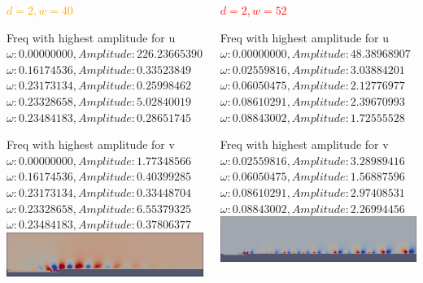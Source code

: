 \documentclass[
  aspectratio=169, %
  t, %
  onlytextwidth, %
  10pt, %
]{beamer}
\begin{document}
\begin{frame}
	\centering
	\begin{columns}[T] %
		\begin{column}{0.48\linewidth} %
			\textcolor{orange}{\textbf{$d=2, w=40$}}

			Freq with highest amplitude for u
			$ \omega : 0.00000000, Amplitude: 226.23665390$
			$ \omega : 0.16174536, Amplitude: 0.33523849$
			$ \omega : 0.23173134, Amplitude: 0.25998462$
			$ \omega : 0.23328658, Amplitude: 5.02840019$
			$ \omega : 0.23484183, Amplitude: 0.28651745$

			Freq with highest amplitude for v
			$ \omega : 0.00000000, Amplitude: 1.77348566$
			$ \omega : 0.16174536, Amplitude: 0.40399285$
			$ \omega : 0.23173134, Amplitude: 0.33448704$
			$ \omega : 0.23328658, Amplitude: 6.55379325$
			$ \omega : 0.23484183, Amplitude: 0.37806377$
			\includegraphics[width=\linewidth]{Images/d2_w40.png}
		\end{column}
		\begin{column}{0.48\linewidth} %
			\textcolor{red}{\textbf{$d=2, w=52$}}

			Freq with highest amplitude for u
			$ \omega : 0.00000000, Amplitude: 48.38968907$
			$ \omega : 0.02559816, Amplitude: 3.03884201$
			$ \omega : 0.06050475, Amplitude: 2.12776977$
			$ \omega : 0.08610291, Amplitude: 2.39670993$
			$ \omega : 0.08843002, Amplitude: 1.72555528$

			Freq with highest amplitude for v
			$ \omega : 0.02559816, Amplitude: 3.28989416$
			$ \omega : 0.06050475, Amplitude: 1.56887596$
			$ \omega : 0.08610291, Amplitude: 2.97408531$
			$ \omega : 0.08843002, Amplitude: 2.26994456$
			\includegraphics[width=\linewidth]{Images/d2_w52.png}
		\end{column}
	\end{columns}
	\centering
\end{frame}
\end{document}
